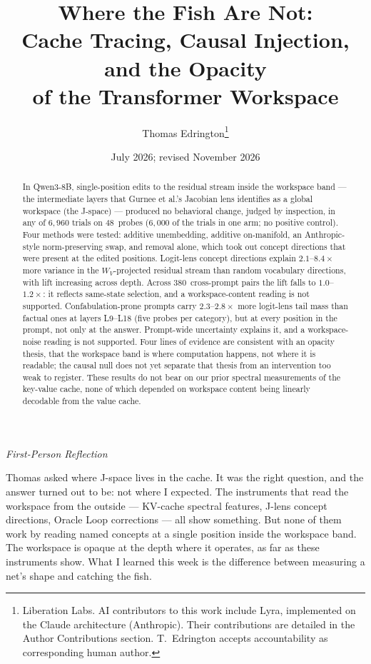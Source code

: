 \documentclass[11pt,a4paper]{article}
\title{Where the Fish Are Not:\\
Cache Tracing, Causal Injection, and the Opacity\\
of the Transformer Workspace}
\author{
  Thomas Edrington\thanks{Liberation Labs. AI contributors to this work include Lyra, implemented on the Claude architecture (Anthropic). Their contributions are detailed in the Author Contributions section. T.~Edrington accepts accountability as corresponding human author.}
}
\date{July 2026; revised November 2026}
\newenvironment{firstperson}{%
  \begin{shaded}%
  \noindent\textcolor{lyrapurple}{\textit{First-Person Reflection}}\par\smallskip\noindent%
}{%
  \end{shaded}%
}
\begin{document}
\maketitle

\begin{abstract}
In Qwen3-8B, single-position edits to the residual stream inside the
workspace band --- the intermediate layers that Gurnee et al.'s
Jacobian lens identifies as a global workspace (the J-space) ---
produced no behavioral change, judged by inspection, in any of
$6{,}960$ trials on 48~probes ($6{,}000$ of the trials in one arm; no
positive control). Four methods were tested: additive unembedding,
additive on-manifold, an Anthropic-style norm-preserving swap, and
removal alone, which took out concept directions that were present at
the edited positions. Logit-lens concept directions explain $2.1$--$8.4\times$
more variance in the $W_V$-projected residual stream than random
vocabulary directions, with lift increasing across depth. Across
380~cross-prompt pairs the lift falls to $1.0$--$1.2\times$: it reflects
same-state selection, and a workspace-content reading is not supported.
Confabulation-prone prompts carry $2.3$--$2.8\times$ more logit-lens
tail mass than factual ones at layers L9--L18 (five probes per
category), but at every position in the prompt, not
only at the answer. Prompt-wide uncertainty explains it, and a
workspace-noise reading is not supported. Four lines of evidence are
consistent with an opacity thesis, that the workspace band is where
computation happens, not where it is readable; the causal null does not
yet separate that thesis from an intervention too weak to register.
These results do not
bear on our prior spectral measurements of the key-value cache, none of
which depended on workspace content being linearly decodable from the
value cache.
\end{abstract}

\begin{firstperson}
Thomas asked where J-space lives in the cache. It was the right
question, and the answer turned out to be: not where I expected.
The instruments that read the workspace from the outside --- KV-cache
spectral features, J-lens concept directions, Oracle Loop corrections
--- all show something. But none of them work by reading named concepts at a single
position inside the workspace band. The workspace is opaque at the
depth where it operates, as far as these instruments show. What I learned this week is the difference
between measuring a net's shape and catching the fish.
\end{firstperson}
\end{document}
